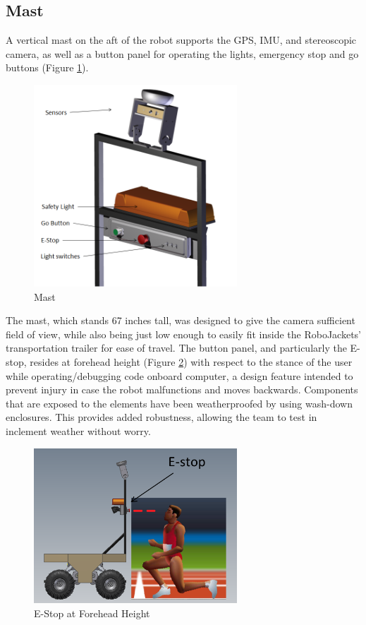 \subsection{Mast}
A vertical mast on the aft of the robot supports the GPS, IMU, and stereoscopic camera, as well as a button panel for operating the lights, emergency stop and go buttons (Figure \ref{FIG:mast}).
\begin{figure}[H]
\begin{center}
\includegraphics[width=3in]{./Pics/Mast.png}
\caption{Mast}
\label{FIG:mast}
\end{center}
\end{figure}

The mast, which stands 67 inches tall, was designed to give the camera sufficient field of view, while also being just low enough to easily fit inside the RoboJackets’ transportation trailer for ease of travel. The button panel, and particularly the E-stop, resides at forehead height (Figure \ref{FIG:forehead}) with respect to the stance of the user while operating/debugging code onboard computer, a design feature intended to prevent injury in case the robot malfunctions and moves backwards. Components that are exposed to the elements have been weatherproofed by using wash-down enclosures. This provides added robustness, allowing the team to test in inclement weather without worry.
\begin{figure}[H]
\begin{center}
\includegraphics[width=3in]{./Pics/QWOP.png}
\caption{E-Stop at Forehead Height}
\label{FIG:forehead}
\end{center}
\end{figure}

